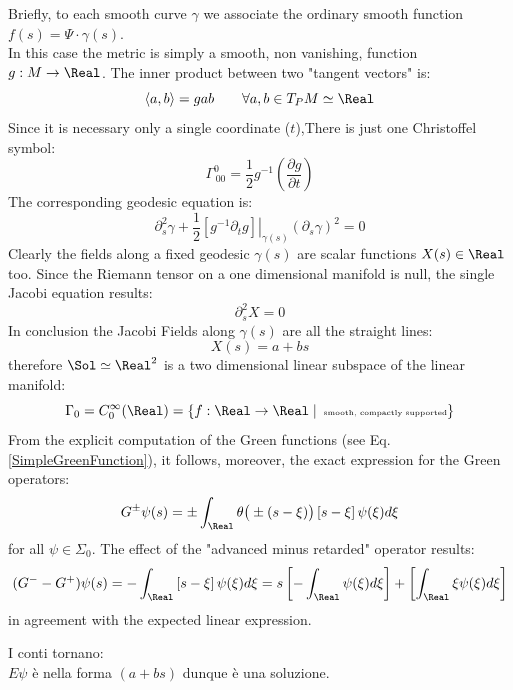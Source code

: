 \documentclass[Main]{subfiles}
\begin{document}
		Briefly, to each smooth curve $\gamma$ we associate the ordinary smooth function $f(s) = \Psi \cdot \gamma (s)$.\\
		In this case the metric is simply a smooth, non vanishing, function $g: M \rightarrow \Real$. The inner product between two "tangent vectors" is:
		\begin{displaymath}
			\left< a , b \right> = g a b \qquad \forall a,b \in T_P M \simeq \Real
		\end{displaymath}
		\ifToninus Since it is necessary only a single coordinate ($t$),\fi There is just one Christoffel symbol:
		\begin{displaymath}
			\Gamma^0_{\, 0 0} = \frac{1}{2} g^{-1} \left( \frac{\partial g}{\partial t} \right)
		\end{displaymath}
		The corresponding geodesic equation is:
		\begin{displaymath}
			\partial^2_s \gamma + \frac{1}{2}\left.\left[ g^{-1}  \partial_t g \right] \right\vert_{\gamma(s)}  \left(\partial_s\gamma\right) ^2 = 0
		\end{displaymath}
		Clearly the fields along a fixed geodesic $\gamma(s)$ are scalar functions $X(s) \in \Real$ too.
		Since the Riemann tensor on a one dimensional manifold is null, the single Jacobi equation results:
		\begin{displaymath}
			\partial_s^2 X = 0
		\end{displaymath}
		In conclusion the Jacobi Fields along $\gamma(s)$ are all the straight lines:
		\begin{displaymath}
			X(s) = a + b s
		\end{displaymath}
		therefore $\Sol \simeq \Real^2$ is a two dimensional linear subspace of the linear manifold:
		\begin{displaymath}
			\Gamma_0 = C_0^\infty (\Real) = \{ f: \Real \rightarrow \Real \; \vert \, \textrm{ \tiny smooth, compactly supported}\}
		\end{displaymath}
		From the explicit computation of the Green functions (see Eq. \ref{SimpleGreenFunction}), it follows, moreover, the exact expression for the Green operators:
		\begin{displaymath}
			G^\pm \psi (s) = \pm \int_\Real \theta\big(\pm(s-\xi)\big) \left[ s  -\xi\right] \psi(\xi) d\xi
		\end{displaymath}
		for all  $\psi \in \Sigma_0$.
		The effect of the "advanced minus retarded" operator results:
		\begin{displaymath}
			( G^- -  G^+ ) \psi(s) =  -\int_\Real \left[ s -\xi\right] \psi(\xi) d\xi = 
			s \left[-\int_\Real \psi(\xi) d\xi \right] + \left[\int_\Real \xi \psi(\xi) d\xi \right]
		\end{displaymath}
		in agreement with the expected linear expression.
		\ifToninus\begin{Warning}
			I conti  tornano:\\  $E \psi$  è nella forma $(a +b s)$ dunque  è una soluzione.
		\end{Warning}\fi
\end{document}
